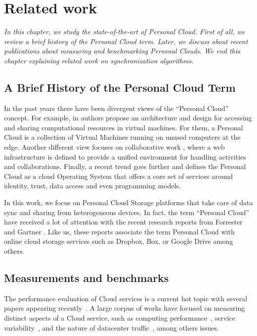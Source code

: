 \chapter{Related work}

\emph{In this chapter, we study the state-of-the-art of Personal Cloud. First of all,
we review a brief history of the Personal Cloud term. Later, we discuss about recent
publications about measuring and benchmarking Personal Clouds. We end this chapter 
explaining related work on synchronization algorithms.}

\section{A Brief History of the Personal Cloud Term}

In the past years there have been divergent views of the ``Personal Cloud'' concept.  
For example, in \cite{hari2012personal} authors propose an architecture and design
for accessing and sharing computational resources in virtual machines. For them, a
Personal Cloud is a collection of Virtual Machines running on unused computers at the edge.
Another different view focuses on collaborative work \cite{ardissono2009service},  
where a web infrastructure is defined to provide a unified environment
for handling activities and collaborations. Finally, a recent trend \cite{windley}
 goes further and defines the Personal Cloud as a cloud Operating 
System that offers a core set of services around identity, trust, data access and 
even programming models.

In this work, we focus on Personal Cloud Storage platforms that take care of data
sync and sharing from heterogeneous devices. In fact,  the term ``Personal Cloud'' have
received a lot of attention with the recent research reports from Forrester \cite{forrester}
and Gartner \cite{gartner}. Like us, these reports associate the term Personal Cloud with
online cloud storage services such as Dropbox, Box, or Google Drive among others.

\section{Measurements and benchmarks}
The performance evaluation of Cloud services is a
current hot topic with several papers appearing 
recently~\cite{variability_ccgrid11, nature_data_center_traffic}. A large corpus 
of works have focused on measuring distinct aspects of a Cloud service,
such as computing performance~\cite{ec2benchmarking}, service 
variability~\cite{variability_ccgrid11}, and the nature of 
datacenter traffic~\cite{nature_data_center_traffic}, among
others issues.

